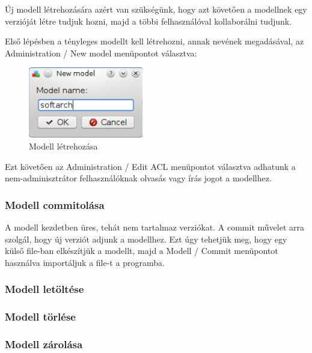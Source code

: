 \documentclass[a4paper,12pt]{article}
\begin{document}
Új modell létrehozására azért van szükségünk, hogy azt követően a modellnek egy
verzióját létre tudjuk hozni, majd a többi felhasználóval kollaborálni tudjunk.

Első lépésben a tényleges modellt kell létrehozni, annak nevének megadásával,
az Administration / New model menüpontot választva:

\begin{figure}[H]
\centering
\includegraphics[width=50mm,keepaspectratio]{model-create.png}
\caption{Modell létrehozása}
\end{figure}

Ezt követően az Administration / Edit ACL menüpontot választva adhatunk a
nem-adminisztrátor felhasználóknak olvasás vagy írás jogot a modellhez.

\subsubsection{Modell commitolása}

A modell kezdetben üres, tehát nem tartalmaz verziókat. A commit művelet arra
szolgál, hogy új verziót adjunk a modellhez. Ezt úgy tehetjük meg, hogy egy
külső file-ban elkészítjük a modellt, majd a Modell / Commit menüpontot
használva importáljuk a file-t a programba.

\subsubsection{Modell letöltése}
\subsubsection{Modell törlése}
\subsubsection{Modell zárolása}
\end{document}
